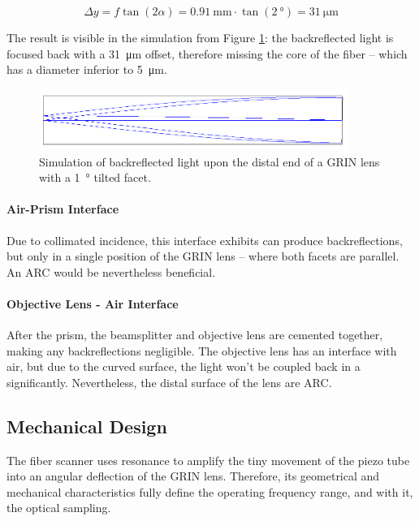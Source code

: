 \begin{equation}
\Delta y = f \tan(2\alpha) = \SI{0.91}{\milli\meter} \cdot \tan (\SI{2}{\degree}) = \SI{31}{\micro\meter}
\label{eq:tilt}
\end{equation}

The result is visible in the simulation from Figure \ref{fig:tilt}: the backreflected light is focused back with a \SI{31}{\micro\meter} offset, therefore missing the core of the fiber -- which has a diameter inferior to \SI{5}{\micro\meter}.

\begin{figure}[h!]\centering
      \includegraphics[width=10cm]{figures/30_DesignSimulation/Optical/backreflection.png}
      \caption{Simulation of backreflected light upon the distal end of a GRIN lens with a \SI{1}{\degree} tilted facet.}
      \label{fig:tilt}
\end{figure}

\paragraph{Air-Prism Interface} Due to collimated incidence, this interface exhibits can produce backreflections, but only in a single position of the GRIN lens -- where both facets are parallel. An ARC would be nevertheless beneficial. 

\paragraph{Objective Lens - Air Interface} After the prism, the beamsplitter and objective lens are cemented together, making any backreflections negligible. The objective lens has an interface with air, but due to the curved surface, the light won't be coupled back in a significantly. Nevertheless, the distal surface of the lens are ARC.

\newpage
\subsection{Mechanical Design}

The fiber scanner uses resonance to amplify the tiny movement of the piezo tube into an angular deflection of the GRIN lens. Therefore, its geometrical and mechanical characteristics fully define the operating frequency range, and with it, the optical sampling.

